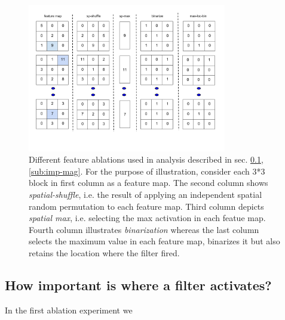 \documentclass[runningheads]{llncs}
\begin{document}
\begin{figure}[H]
\centering
\includegraphics[height=6.5cm]{images/features.png}
\caption{Different feature ablations used in analysis described in sec. \ref{sub:imp-loc}, \ref{sub:imp-mag}. For the purpose of illustration, consider each 3*3 block in first column as a feature map. The second column shows \textit{spatial-shuffle}, i.e. the  result of applying an independent spatial random permutation to each feature map. Third column depicts \textit{spatial max}, i.e. selecting the max activation in each featue map. Fourth column illustrates \textit{binarization} whereas the last column selects the maximum value in each feature map, binarizes it but also retains the location where the filter fired.}
\label{fig:features}
\end{figure}

\subsection{How important is where a filter activates?}
\label{sub:imp-loc}
In the first ablation experiment we 
\end{document}

